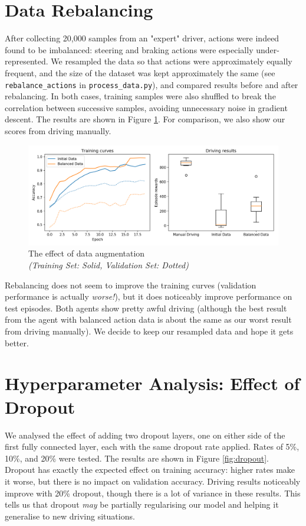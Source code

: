 \documentclass[11pt]{article} %
\begin{document}
\section{Data Rebalancing}

After collecting 20,000 samples from an "expert" driver, actions were indeed found to be imbalanced: steering and braking actions were especially under-represented. We resampled the data so that actions were approximately equally frequent, and the size of the dataset was kept approximately the same (see \texttt{rebalance\_actions} in \texttt{process\_data.py}), and compared results before and after rebalancing. In both cases, training samples were also shuffled to break the correlation between successive samples, avoiding unnecessary noise in gradient descent.  The results are shown in Figure \ref{fig:balance}. For comparison, we also show our scores from driving manually.

\begin{figure}
  \includegraphics[width=\linewidth]{figs/balance.png}
  \caption{The effect of data augmentation \\ \textit{(Training Set: Solid, Validation Set: Dotted)}}
  \label{fig:balance}
\end{figure}

Rebalancing does not seem to improve the training curves (validation performance is actually \textit{worse!}), but it does noticeably improve performance on test episodes. Both agents show pretty awful driving (although the best result from the agent with balanced action data is about the same as our worst result from driving manually). We decide to keep our resampled data and hope it gets better.

\section{Hyperparameter Analysis: Effect of Dropout}

We analysed the effect of adding two dropout layers, one on either side of the first fully connected layer, each with the same dropout rate applied. Rates of 5\%, 10\%, and 20\% were tested. The results are shown in Figure \ref{fig:dropout}. Dropout has exactly the expected effect on training accuracy: higher rates make it worse, but there is no impact on validation accuracy. Driving results noticeably improve with 20\% dropout, though there is a lot of variance in these results. This tells us that dropout \textit{may} be partially  regularising our model and helping it generalise to new driving situations.
\end{document}

